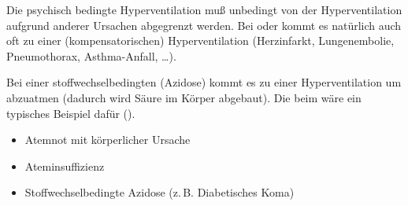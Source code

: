 {%
Die psychisch bedingte Hyperventilation muß unbedingt von
der Hyperventilation aufgrund anderer Ursachen abgegrenzt
werden. Bei  oder  kommt es natürlich auch
oft zu einer (kompensatorischen) Hyperventilation
(Herzinfarkt, Lungenembolie, Pneumothorax, Asthma-Anfall,
\ldots).

Bei einer stoffwechselbedingten  (Azidose)
kommt es zu einer Hyperventilation um  abzuatmen
(dadurch wird Säure im Körper abgebaut). Die
 beim  wäre
ein typisches Beispiel dafür
().

}{
\begin{itemize}
  \item Atemnot mit körperlicher Ursache
  \item Ateminsuffizienz
  \item Stoffwechselbedingte Azidose (z.\,B. Diabetisches Koma)
\end{itemize}
}{}{}{}


% 

